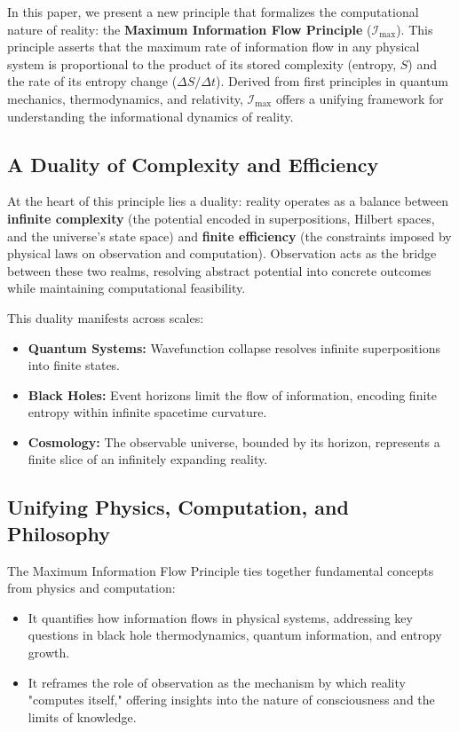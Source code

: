 \documentclass[12pt]{article}
\begin{document}
In this paper, we present a new principle that formalizes the computational nature of reality: the \textbf{Maximum Information Flow Principle} ($\mathcal{I}_{\text{max}}$). This principle asserts that the maximum rate of information flow in any physical system is proportional to the product of its stored complexity (entropy, \( S \)) and the rate of its entropy change ($\Delta S / \Delta t$). Derived from first principles in quantum mechanics, thermodynamics, and relativity, $\mathcal{I}_{\text{max}}$ offers a unifying framework for understanding the informational dynamics of reality.

\subsection{A Duality of Complexity and Efficiency}

At the heart of this principle lies a duality: reality operates as a balance between \textbf{infinite complexity} (the potential encoded in superpositions, Hilbert spaces, and the universe’s state space) and \textbf{finite efficiency} (the constraints imposed by physical laws on observation and computation). Observation acts as the bridge between these two realms, resolving abstract potential into concrete outcomes while maintaining computational feasibility.

This duality manifests across scales:
\begin{itemize}
    \item \textbf{Quantum Systems:} Wavefunction collapse resolves infinite superpositions into finite states.
    \item \textbf{Black Holes:} Event horizons limit the flow of information, encoding finite entropy within infinite spacetime curvature.
    \item \textbf{Cosmology:} The observable universe, bounded by its horizon, represents a finite slice of an infinitely expanding reality.
\end{itemize}

\subsection{Unifying Physics, Computation, and Philosophy}

The Maximum Information Flow Principle ties together fundamental concepts from physics and computation:
\begin{itemize}
    \item It quantifies how information flows in physical systems, addressing key questions in black hole thermodynamics, quantum information, and entropy growth.
    \item It reframes the role of observation as the mechanism by which reality "computes itself," offering insights into the nature of consciousness and the limits of knowledge.
\end{itemize}
\end{document}
